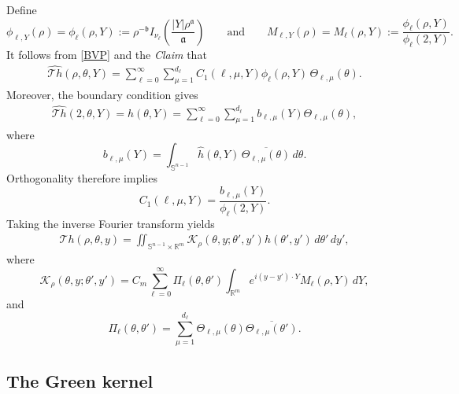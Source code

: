 \documentclass[12pt]{amsart}
\begin{document}
Define
\begin{equation*}
    \phi_{\ell, Y}(\rho) = \phi_{\ell}(\rho,Y):= \rho^{-\mathfrak b} I_{\nu_\ell}\left( \frac{|Y| \rho^{\mathfrak a}}{\mathfrak a} \right)
    \qquad \textrm{and}\qquad
    M_{\ell, Y}(\rho) = M_{\ell}(\rho,Y):= \frac{\phi_{\ell}(\rho,Y)}{\phi_{\ell}(2,Y)}.
\end{equation*}
It follows from \eqref{BVP} and the \textit{Claim} that
\begin{align*}
    \widehat{\mathcal{T}h}(\rho,\theta,Y) = \sum_{\ell=0}^\infty \sum_{\mu=1}^{d_\ell} C_1(\ell,\mu,Y) \phi_{\ell}(\rho,Y)\, \Theta_{\ell,\mu}(\theta).
\end{align*}
Moreover, the boundary condition gives
\begin{align*}
    \widehat{\mathcal{T}h}(2,\theta,Y) = \hat{h}(\theta,Y) = \sum_{\ell=0}^\infty \sum_{\mu=1}^{d_\ell} b_{\ell,\mu}(Y) \Theta_{\ell,\mu}(\theta),
\end{align*}
where
\begin{equation*}
    b_{\ell,\mu}(Y) = \int_{\mathbb{S}^{n-1}} \hat{h}(\theta,Y)\, \overline{\Theta_{\ell,\mu}(\theta)}\, d\theta.
\end{equation*}
Orthogonality therefore implies
\begin{equation*}
    C_1(\ell,\mu,Y) = \frac{b_{\ell,\mu}(Y)}{\phi_{\ell}(2,Y)}.
\end{equation*}
Taking the inverse Fourier transform yields
\begin{align*}
    \mathcal{T}h(\rho,\theta,y) = \iint_{\mathbb{S}^{n-1}\times \mathbb{R}^m} \mathcal{K}_{\rho}(\theta,y; \theta', y') h(\theta', y')\, d\theta'\, dy',
\end{align*}
where
\begin{equation}\label{eq_kernel_of_T}
    \mathcal{K}_{\rho}(\theta,y; \theta', y') = C_m \sum_{\ell=0}^\infty \Pi_{\ell}(\theta,\theta') \int_{\mathbb{R}^m} e^{i(y-y')\cdot Y} M_{\ell}(\rho,Y)\, dY,
\end{equation}
and
\begin{equation*}
    \Pi_{\ell}(\theta,\theta') = \sum_{\mu=1}^{d_\ell} \Theta_{\ell,\mu}(\theta) \overline{\Theta_{\ell,\mu}(\theta')}.
\end{equation*}

\subsection{The Green kernel}\label{ssec:Green:n>2}
\end{document}
